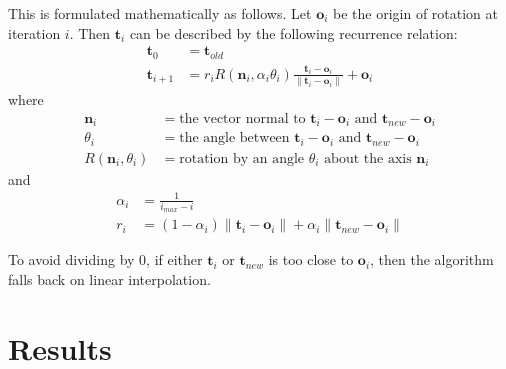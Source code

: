 \documentclass[10pt,twocolumn,letterpaper]{article}
\begin{document}
This is formulated mathematically as follows. Let $\bm{o}_i$ be the origin of rotation at iteration $i$.  Then $\bm{t}_i$ can be described by the following recurrence relation:
\begin{equation}
    \begin{aligned}
    \bm{t}_0 &= \bm{t}_{old} \\
    \bm{t}_{i+1} &= r_i R(\bm{n}_i, \alpha_i \theta_i) \frac{ \bm{t}_i - \bm{o}_i } { \| \bm{t}_i - \bm{o}_i \| } + \bm{o}_i
    \end{aligned}
\end{equation}
where 
\begin{align*}
\bm{n}_i &= \text{the vector normal to } \bm{t}_i - \bm{o}_i \text{ and } \bm{t}_{new} - \bm{o}_i \\
\theta_i &= \text{the angle between } \bm{t}_i - \bm{o}_i \text{ and } \bm{t}_{new} - \bm{o}_i \\
R(\bm{n}_i, \theta_i) &= \text{rotation by an angle } \theta_i \text{ about the axis } \bm{n}_i 
\end{align*}
and
\begin{align*}
    \alpha_i &= \frac{1}{i_{max} - i} \\
    r_i &= (1 - \alpha_i) \| \bm{t}_i - \bm{o}_i \| + \alpha_i \| \bm{t}_{new} - \bm{o}_i \| 
\end{align*} 

To avoid dividing by 0, if either $\bm{t}_i$ or $\bm{t}_{new}$ is too close to $\bm{o}_i$, then the algorithm falls back on linear interpolation.

\section{Results}
\end{document}
